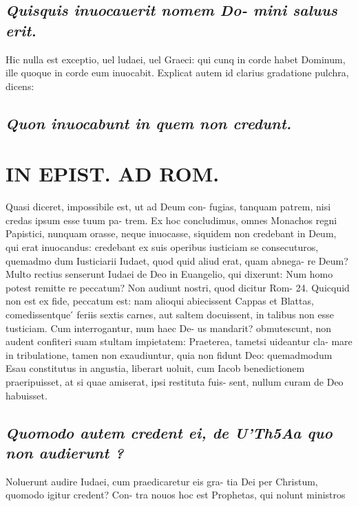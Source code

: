 \documentclass{article}
\begin{document}
\begin{pages}
\subsection*{\textit{Quisquis inuocauerit nomem Do- mini saluus erit. }}\pstart Hic nulla est exceptio, uel ludaei, uel Graeci: qui cunq in corde habet Dominum, ille quoque in corde eum inuocabit. Explicat autem id clarius gradatione pulchra, dicens:  \pend
{}
{}
\subsection*{\textit{Quon inuocabunt in quem non credunt. }}
\section*{IN EPIST. AD ROM.  }
\marginpar{[ p.121 ]}\pstart Quasi diceret, impossibile est, ut ad Deum con- fugias, tanquam patrem, nisi credas ipsum esse tuum pa- trem. Ex hoc concludimus, omnes Monachos regni Papistici, nunquam orasse, neque inuocasse, siquidem non credebant in Deum, qui erat inuocandus: credebant ex suis operibus iusticiam se consecuturos, quemadmo dum Iusticiarii Iudaet, quod quid aliud erat, quam abnega- re Deum? Multo rectius senserunt Iudaei de Deo in Euangelio, qui dixerunt: Num homo potest remitte re peccatum? Non audiunt nostri, quod dicitur Rom- 24. Quicquid non est ex fide, peccatum est: nam alioqui abiecissent Cappas et Blattas, comedissentque ́ feriis sextis carnes, aut saltem docuissent, in talibus non esse tusticiam. Cum interrogantur, num haec De- us mandarit? obmutescunt, non audent confiteri suam stultam impietatem: Praeterea, tametsi uideantur cla- mare in tribulatione, tamen non exaudiuntur, quia non fidunt Deo: quemadmodum Esau constitutus in angustia, liberart uoluit, cum Iacob benedictionem praeripuisset, at si quae amiserat, ipsi restituta fuis- sent, nullum curam de Deo habuisset.   \pend
{}
{}
\subsection*{\textit{Quomodo autem credent ei, de U'Th5Aa quo non audierunt ? }}\pstart Noluerunt audire Iudaei, cum praedicaretur eis gra- tia Dei per Christum, quomodo igitur credent? Con- tra nouos hoc est Prophetas, qui nolunt ministros  \pend
{}
{}

\end{pages}
\end{document}
